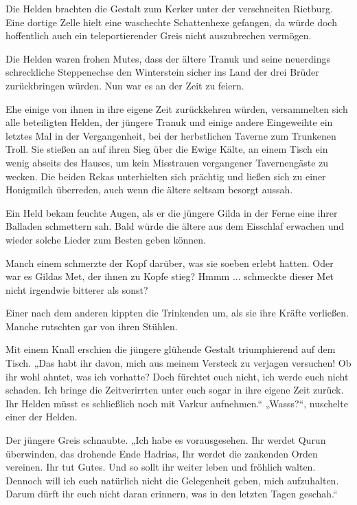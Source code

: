 \documentclass[10pt, a4paper, oneside]{book}
\begin{document}
Die Helden brachten die Gestalt zum Kerker unter der verschneiten Rietburg. Eine dortige Zelle hielt eine waschechte Schattenhexe gefangen, da würde doch hoffentlich auch ein teleportierender Greis nicht auszubrechen vermögen.\bigskip

Die Helden waren frohen Mutes, dass der ältere Tranuk und seine neuerdings schreckliche Steppenechse den Winterstein sicher ins Land der drei Brüder zurückbringen würden. Nun war es an der Zeit zu feiern. \bigskip

Ehe einige von ihnen in ihre eigene Zeit zurückkehren würden, versammelten sich alle beteiligten Helden, der jüngere Tranuk und einige andere Eingeweihte ein letztes Mal in der Vergangenheit, bei der herbstlichen Taverne zum Trunkenen Troll. Sie stießen an auf ihren Sieg über die Ewige Kälte, an einem Tisch ein wenig abseits des Hauses, um kein Misstrauen vergangener Tavernengäste zu wecken. Die beiden Rekas unterhielten sich prächtig und ließen sich zu einer Honigmilch überreden, auch wenn die ältere seltsam besorgt aussah. 

Ein Held bekam feuchte Augen, als er die jüngere Gilda in der Ferne eine ihrer Balladen schmettern sah. Bald würde die ältere aus dem Eisschlaf erwachen und wieder solche Lieder zum Besten geben können. 

Manch einem schmerzte der Kopf darüber, was sie soeben erlebt hatten. Oder war es Gildas Met, der ihnen zu Kopfe stieg? Hmmm ... schmeckte dieser Met nicht irgendwie bitterer als sonst?

Einer nach dem anderen kippten die Trinkenden um, als sie ihre Kräfte verließen. Manche rutschten gar von ihren Stühlen. 

Mit einem Knall erschien die jüngere glühende Gestalt triumphierend auf dem Tisch. „Das habt ihr davon, mich aus meinem Versteck zu verjagen versuchen! Ob ihr wohl ahntet, was ich vorhatte? Doch fürchtet euch nicht, ich werde euch nicht schaden. Ich bringe die Zeitverirrten unter euch sogar in ihre eigene Zeit zurück. Ihr Helden müsst es schließlich noch mit Varkur aufnehmen.“ „Wasss?“, nuschelte einer der Helden. 

Der jüngere Greis schnaubte. „Ich habe es vorausgesehen. Ihr werdet Qurun überwinden, das drohende Ende Hadrias, Ihr werdet die zankenden Orden vereinen. Ihr tut Gutes. Und so sollt ihr weiter leben und fröhlich walten. Dennoch will ich euch natürlich nicht die Gelegenheit geben, mich aufzuhalten. Darum dürft ihr euch nicht daran erinnern, was in den letzten Tagen geschah.“ 
\end{document}
